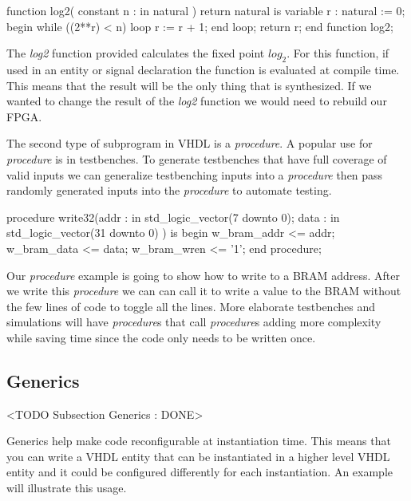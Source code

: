 \begin{VHDLlisting}[tabsize=4]
function log2(
	constant n : in natural
) return natural is
	variable r : natural := 0;
begin
	while ((2**r) < n) loop
		r := r + 1;
	end loop;
	return r;
end function log2;
\end{VHDLlisting}

The \emph{log2} function provided calculates the fixed point $log_2$. For this function, if used in an entity or signal declaration the function is evaluated at compile time. This means that the result will be the only thing that is synthesized. If we wanted to change the result of the \emph{log2} function we would need to rebuild our \ac{FPGA}. 

The second type of subprogram in \ac{VHDL} is a \emph{procedure}. A popular use for \emph{procedure} is in testbenches. To generate testbenches that have full coverage of valid inputs we can generalize testbenching inputs into a \emph{procedure} then pass randomly generated inputs into the \emph{procedure} to automate testing. 

\begin{VHDLlisting}[tabsize=4]
procedure write32(addr : in std_logic_vector(7 downto 0);
                  data : in std_logic_vector(31 downto 0) ) is
begin
    w_bram_addr <= addr;
    w_bram_data <= data;
    w_bram_wren <= '1';
end procedure;
\end{VHDLlisting}

Our \emph{procedure} example is going to show how to write to a \ac{BRAM} address. After we write this \emph{procedure} we can can call it to write a value to the \ac{BRAM} without the few lines of code to toggle all the lines. More elaborate testbenches and simulations will have \emph{procedure}s that call \emph{procedure}s adding more complexity while saving time since the code only needs to be written once. 


\subsection{Generics}
	<TODO Subsection Generics : DONE>

Generics help make code reconfigurable at instantiation time. This means that you can write a \ac{VHDL} entity that can be instantiated in a higher level \ac{VHDL} entity and it could be configured differently for each instantiation. An example will illustrate this usage. 

